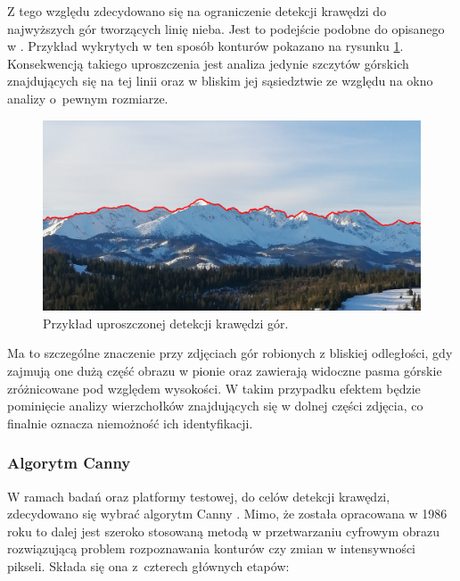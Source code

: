 Z tego względu zdecydowano się na ograniczenie detekcji krawędzi do najwyższych gór tworzących linię nieba. Jest to podejście podobne do opisanego w \cite{large-scale-visual}. Przykład wykrytych w ten sposób konturów pokazano na rysunku \ref{fig:edge_detected}. Konsekwencją takiego uproszczenia jest analiza jedynie szczytów górskich znajdujących się na tej linii oraz w bliskim jej sąsiedztwie ze względu na okno analizy o~pewnym rozmiarze. 



\begin{figure}[!h]
    \centering \includegraphics[width=0.75\linewidth]{img/image-2023-03-04_072211_edge.png}
    \caption{Przykład uproszczonej detekcji krawędzi gór.}
    \label{fig:edge_detected}
\end{figure}


Ma to szczególne znaczenie przy zdjęciach gór robionych z bliskiej odległości, gdy zajmują one dużą część obrazu w pionie oraz zawierają widoczne pasma górskie zróżnicowane pod względem wysokości. W takim przypadku efektem będzie pominięcie analizy wierzchołków znajdujących się w dolnej części zdjęcia, co finalnie oznacza niemożność ich identyfikacji. 

\subsubsection{Algorytm Canny} \label{sec:canny}

W ramach badań oraz platformy testowej, do celów detekcji krawędzi, zdecydowano się wybrać algorytm Canny \cite{Canny,SegmentationEdgeDetection,Canny_Opencv}. Mimo, że została opracowana w 1986 roku to dalej jest szeroko stosowaną metodą w przetwarzaniu cyfrowym obrazu rozwiązującą problem rozpoznawania konturów czy zmian w intensywności pikseli. Składa się ona z~czterech głównych etapów:

